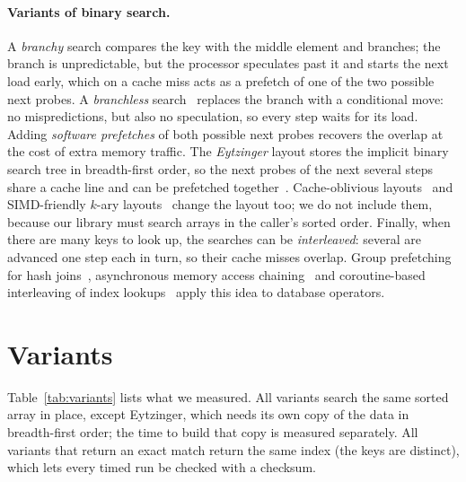 \documentclass[11pt]{article}
\begin{document}
\paragraph{Variants of binary search.} A \emph{branchy} search compares the key
with the middle element and branches; the branch is unpredictable, but the
processor speculates past it and starts the next load early, which on a cache
miss acts as a prefetch of one of the two possible next probes. A
\emph{branchless} search~\cite{khuong2017layouts} replaces the branch with a
conditional move: no mispredictions, but also no speculation, so every step
waits for its load. Adding \emph{software prefetches} of both possible next
probes recovers the overlap at the cost of extra memory traffic. The
\emph{Eytzinger} layout stores the implicit binary search tree in
breadth-first order, so the next probes of the next several steps share a
cache line and can be prefetched together~\cite{khuong2017layouts}.
Cache-oblivious layouts~\cite{brodal2002cacheoblivious} and SIMD-friendly
$k$-ary layouts~\cite{schlegel2009kary,kim2010fast} change the layout too; we do
not include them, because our library must search arrays in the caller's sorted
order. Finally, when there are many keys to look up, the searches can be
\emph{interleaved}: several are advanced one step each in turn, so their cache
misses overlap. Group prefetching for hash joins~\cite{chen2004hashjoin},
asynchronous memory access chaining~\cite{kocberber2015amac} and coroutine-based
interleaving of index lookups~\cite{psaropoulos2017coroutines} apply this idea
to database operators.

\section{Variants}\label{sec:variants}

Table~\ref{tab:variants} lists what we measured. All variants search the same
sorted array in place, except Eytzinger, which needs its own copy of the
data in breadth-first order; the time to build that copy is measured
separately. All variants that return an exact match return the same index
(the keys are distinct), which lets every timed run be checked with a
checksum.
\end{document}
